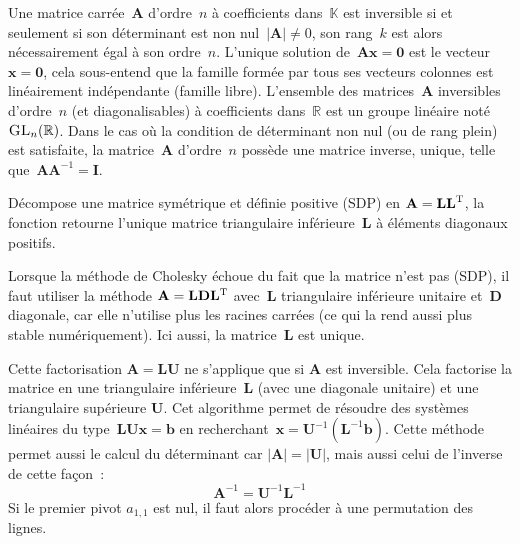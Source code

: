 \documentclass[11pt]{article}
\newcommand{\R}{\mathbf{\mathds{R}}}
\newcommand{\K}{\mathbf{\mathds{K}}}
\newcommand{\mb}[1]{\mathbf{#1}}
\newcommand{\vb}[1]{\mathbf{#1}}
\let\mathds\mathbb
\begin{document}
\begin{description}[leftmargin=4cm, style=nextline]
\item[\texttt{inverse()}] 
Une matrice carr\'ee~$\mb{A}$ d'ordre~$n$ \`a coefficients dans~$\K$ est inversible si et seulement si son d\'eterminant est non nul~$|\mb{A}|\neq0$,
son rang~$k$ est alors n\'ecessairement \'egal \`a son ordre~$n$. L'unique solution de~$\mb{A}\vb{x}=\vb{0}$ est le vecteur~$\vb{x}=\vb{0}$,
cela sous-entend que la famille form\'ee par tous ses vecteurs colonnes est lin\'eairement ind\'ependante (famille libre). L'ensemble des matrices~$\mb{A}$ inversibles
d'ordre~$n$ (et diagonalisables) \`a coefficients dans~$\R$ est un groupe lin\'eaire not\'e~$\textsc{GL}_{n}(\R)$. Dans le cas o\`u la condition de d\'eterminant
non nul (ou de rang plein) est satisfaite, la matrice~$\mb{A}$ d'ordre~$n$ poss\`ede une matrice inverse, unique, telle que~$\mb{A}\mb{A}^{-1} = \mb{I}$.\\

\item[\texttt{Cholesky()}] 
Décompose une matrice symétrique et définie positive (SDP) en $\mb{A} = \mb{LL}^{\textsc{T}}$, la fonction retourne l'unique matrice triangulaire inférieure~$\mb{L}$ \`a \'el\'ements diagonaux positifs.\\

\item[\texttt{LDLT()}] 
Lorsque la m\'ethode de Cholesky \'echoue du fait que la matrice n'est pas (SDP), il faut utiliser la m\'ethode $\mb{A} = \mb{L}\mb{D}\mb{L}^{\textsc{T}}$ avec~$\mb{L}$
triangulaire inf\'erieure unitaire et~$\mb{D}$ diagonale, car elle n'utilise plus les racines carr\'ees (ce qui la rend aussi plus stable numériquement). Ici aussi, la matrice~$\mb{L}$ est unique.\\

\item[\texttt{LU()}] 
Cette factorisation $\mb{A} = \mb{LU}$ ne s'applique que si $\mb{A}$ est inversible. Cela factorise la matrice en une triangulaire inf\'erieure~$\mb{L}$ (avec une diagonale unitaire)
et une triangulaire sup\'erieure $\mb{U}$. Cet algorithme permet de r\'esoudre des syst\`emes lin\'eaires du type~$\mb{L}\mb{U}\vb{x}=\vb{b}$ en recherchant~$\vb{x} = \mb{U}^{-1}(\mb{L}^{-1}\vb{b})$.
Cette m\'ethode permet aussi le calcul du d\'eterminant car $|\mb{A}|=|\mb{U}|$, mais aussi celui de l'inverse de cette fa\c{c}on~:
$$\mb{A}^{-1} = \mb{U}^{-1}\mb{L}^{-1}$$
Si le premier pivot $a_{1,1}$ est nul, il faut alors proc\'eder \`a une permutation des lignes.\\


\end{description}
\end{document}
